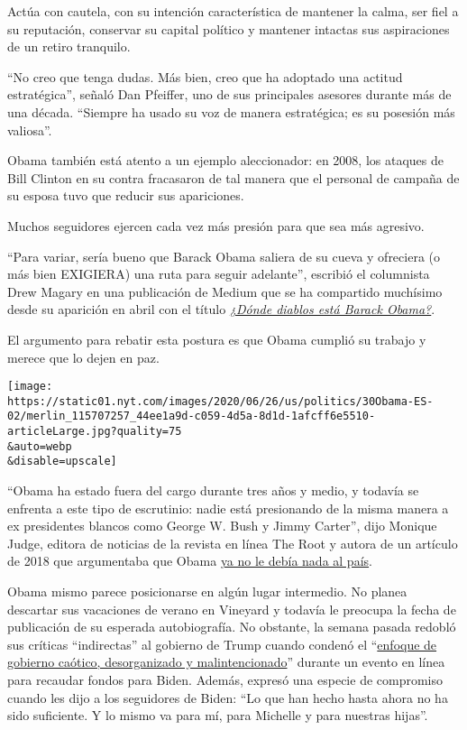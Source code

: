 Actúa con cautela, con su intención característica de mantener la calma,
ser fiel a su reputación, conservar su capital político y mantener
intactas sus aspiraciones de un retiro tranquilo.

``No creo que tenga dudas. Más bien, creo que ha adoptado una actitud
estratégica'', señaló Dan Pfeiffer, uno de sus principales asesores
durante más de una década. ``Siempre ha usado su voz de manera
estratégica; es su posesión más valiosa''.

Obama también está atento a un ejemplo aleccionador: en 2008, los
ataques de Bill Clinton en su contra fracasaron de tal manera que el
personal de campaña de su esposa tuvo que reducir sus apariciones.

Muchos seguidores ejercen cada vez más presión para que sea más
agresivo.

``Para variar, sería bueno que Barack Obama saliera de su cueva y
ofreciera (o más bien EXIGIERA) una ruta para seguir adelante'',
escribió el columnista Drew Magary en una publicación de Medium que se
ha compartido muchísimo desde su aparición en abril con el título
\href{https://gen.medium.com/where-the-hell-is-barack-obama-397ce8d7bbe2}{\emph{¿Dónde
diablos está Barack Obama?}}.

El argumento para rebatir esta postura es que Obama cumplió su trabajo y
merece que lo dejen en paz.

\texttt{[image: https://static01.nyt.com/images/2020/06/26/us/politics/30Obama-ES-02/merlin\_115707257\_44ee1a9d-c059-4d5a-8d1d-1afcff6e5510-articleLarge.jpg?quality=75\\\&auto=webp\\\&disable=upscale]}

``Obama ha estado fuera del cargo durante tres años y medio, y todavía
se enfrenta a este tipo de escrutinio: nadie está presionando de la
misma manera a ex presidentes blancos como George W. Bush y Jimmy
Carter'', dijo Monique Judge, editora de noticias de la revista en línea
The Root y autora de un artículo de 2018 que argumentaba que Obama
\href{https://www.theroot.com/obama-doesn-t-owe-this-country-shit-1826309455}{ya
no le debía nada al país}.

Obama mismo parece posicionarse en algún lugar intermedio. No planea
descartar sus vacaciones de verano en Vineyard y todavía le preocupa la
fecha de publicación de su esperada autobiografía. No obstante, la
semana pasada redobló sus críticas ``indirectas'' al gobierno de Trump
cuando condenó el
``\href{https://www.nytimes.com/2020/06/23/us/politics/obama-biden-fundraiser.html}{enfoque
de gobierno caótico, desorganizado y malintencionado}'' durante un
evento en línea para recaudar fondos para Biden. Además, expresó una
especie de compromiso cuando les dijo a los seguidores de Biden: ``Lo
que han hecho hasta ahora no ha sido suficiente. Y lo mismo va para mí,
para Michelle y para nuestras hijas''.

